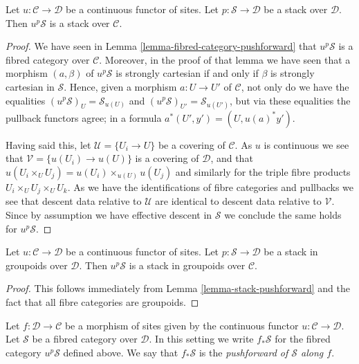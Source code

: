\begin{lemma}
\label{lemma-stack-pushforward}
Let $u : \mathcal{C} \to \mathcal{D}$ be a continuous functor of sites.
Let $p : \mathcal{S} \to \mathcal{D}$ be a stack over $\mathcal{D}$.
Then $u^p\mathcal{S}$ is a stack over $\mathcal{C}$.
\end{lemma}

\begin{proof}
We have seen in
Lemma \ref{lemma-fibred-category-pushforward}
that $u^p\mathcal{S}$ is a fibred category over $\mathcal{C}$.
Moreover, in the proof of that lemma we have seen that a morphism
$(a, \beta)$ of $u^p\mathcal{S}$ is strongly cartesian if and
only if $\beta$ is strongly cartesian in $\mathcal{S}$. Hence,
given a morphism $a : U \to U'$ of $\mathcal{C}$, not only
do we have the equalities
$(u^p\mathcal{S})_U = \mathcal{S}_{u(U)}$ and
$(u^p\mathcal{S})_{U'} = \mathcal{S}_{u(U')}$, but via these
equalities the pullback functors agree; in a formula
$a^*(U', y') = (U, u(a)^*y')$.

\medskip\noindent
Having said this, let $\mathcal{U} = \{U_i \to U\}$ be a covering
of $\mathcal{C}$. As $u$ is continuous we see that
$\mathcal{V} = \{u(U_i) \to u(U)\}$ is a covering of $\mathcal{D}$,
and that $u(U_i \times_U U_j) = u(U_i) \times_{u(U)} u(U_j)$ and
similarly for the triple fibre products $U_i \times_U U_j \times_U U_k$.
As we have the identifications of fibre categories and pullbacks
we see that descent data relative to $\mathcal{U}$ are identical
to descent data relative to $\mathcal{V}$. Since by assumption we have
effective descent in $\mathcal{S}$ we conclude the same holds for
$u^p\mathcal{S}$.
\end{proof}

\begin{lemma}
\label{lemma-stack-in-groupoids-pushforward}
Let $u : \mathcal{C} \to \mathcal{D}$ be a continuous functor of sites.
Let $p : \mathcal{S} \to \mathcal{D}$ be a stack in groupoids
over $\mathcal{D}$. Then $u^p\mathcal{S}$ is a stack in groupoids
over $\mathcal{C}$.
\end{lemma}

\begin{proof}
This follows immediately from
Lemma \ref{lemma-stack-pushforward}
and the fact that all fibre categories are groupoids.
\end{proof}

\begin{definition}
\label{definition-pushforward-stack}
Let $f : \mathcal{D} \to \mathcal{C}$ be a morphism of sites
given by the continuous functor $u : \mathcal{C} \to \mathcal{D}$.
Let $\mathcal{S}$ be a fibred category over $\mathcal{D}$.
In this setting we write {\it $f_*\mathcal{S}$} for the fibred
category $u^p\mathcal{S}$ defined above. We say that
$f_*\mathcal{S}$ is the {\it pushforward of $\mathcal{S}$ along $f$}.
\end{definition}

